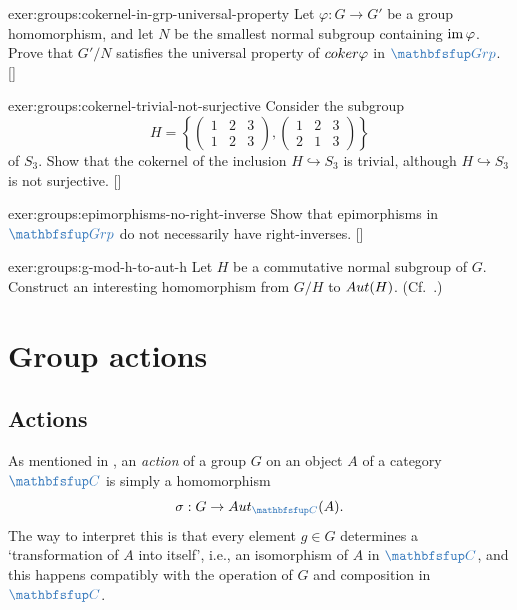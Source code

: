 \begin{exer}{\exerused}{exer:groups:cokernel-in-grp-universal-property}
  Let $\varphi : G \to G'$ be a group homomorphism, and let $N$ be the
  smallest normal subgroup containing $\operatorname{im}\varphi$. Prove that
  $G'/N$ satisfies the universal property of $coker\varphi$ in
  $\categ{Grp}$. []
\end{exer}
\begin{exer}{\exerused}{exer:groups:cokernel-trivial-not-surjective}
  Consider the subgroup
  \[
    H = \left\{ \begin{pmatrix}1&2&3\\1&2&3\end{pmatrix},
      \begin{pmatrix}1&2&3\\2&1&3\end{pmatrix} \right\}
  \]
  of $S_3$. Show that the cokernel of the inclusion
  $H \hookrightarrow S_3$ is trivial, although $H \hookrightarrow S_3$
  is not surjective.
  []
\end{exer}
\begin{exer}{\exerused}{exer:groups:epimorphisms-no-right-inverse}
  Show that epimorphisms in $\categ{Grp}$ do not necessarily have
  right-inverses. []
\end{exer}
\begin{exer}{}{exer:groups:g-mod-h-to-aut-h}
  Let $H$ be a commutative normal subgroup of $G$. Construct an
  interesting homomorphism from $G/H$ to $Aut(H)$. (Cf.\
  .)
\end{exer}

\section{Group actions}
\label{sec:groups:group-actions}


\subsection{Actions}
\label{subsec:groups:actions}
As mentioned in , an \emph{action} of
a group $G$ on an object $A$ of a category $\categ{C}$ is simply a
homomorphism
\[
  \sigma : G \to \Aut_{\categ{C}}(A).
\]
The way to interpret this is that every element $g \in G$ determines a
`transformation of $A$ into itself', i.e., an isomorphism of $A$ in
$\categ{C}$, and this happens compatibly with the operation of $G$ and
composition in $\categ{C}$.

